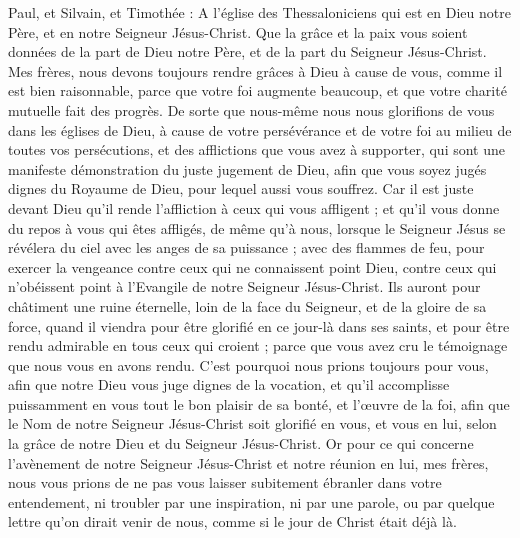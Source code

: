 \begin{multicols}{2}
\VerseOne{}Paul, et Silvain, et Timothée : A l'église des Thessaloniciens qui est en Dieu notre Père, et en notre Seigneur Jésus-Christ.
Que la grâce et la paix vous soient données de la part de Dieu notre Père, et de la part du Seigneur Jésus-Christ.
Mes frères, nous devons toujours rendre grâces à Dieu à cause de vous, comme il est bien raisonnable, parce que votre foi augmente beaucoup, et que votre charité mutuelle fait des progrès.
De sorte que nous-même nous nous glorifions de vous dans les églises de Dieu, à cause de votre persévérance et de votre foi au milieu de toutes vos persécutions, et des afflictions que vous avez à supporter,
qui sont une manifeste démonstration du juste jugement de Dieu, afin que vous soyez jugés dignes du Royaume de Dieu, pour lequel aussi vous souffrez.
Car il est juste devant Dieu qu'il rende l'affliction à ceux qui vous affligent ;
et qu'il vous donne du repos à vous qui êtes affligés, de même qu'à nous, lorsque le Seigneur Jésus se révélera du ciel avec les anges de sa puissance ;
avec des flammes de feu, pour exercer la vengeance contre ceux qui ne connaissent point Dieu, contre ceux qui n'obéissent point à l'Evangile de notre Seigneur Jésus-Christ.
Ils auront pour châtiment une ruine éternelle, loin de la face du Seigneur, et de la gloire de sa force,
quand il viendra pour être glorifié en ce jour-là dans ses saints, et pour être rendu admirable en tous ceux qui croient ; parce que vous avez cru le témoignage que nous vous en avons rendu.
C'est pourquoi nous prions toujours pour vous, afin que notre Dieu vous juge dignes de la vocation, et qu'il accomplisse puissamment en vous tout le bon plaisir de sa bonté, et l'œuvre de la foi,
afin que le Nom de notre Seigneur Jésus-Christ soit glorifié en vous, et vous en lui, selon la grâce de notre Dieu et du Seigneur Jésus-Christ.
\VerseOne{}Or pour ce qui concerne l'avènement de notre Seigneur Jésus-Christ et notre réunion en lui, mes frères, nous vous prions
de ne pas vous laisser subitement ébranler dans votre entendement, ni troubler par une inspiration, ni par une parole, ou par quelque lettre qu'on dirait venir de nous, comme si le jour de Christ était déjà là.

\end{multicols}
